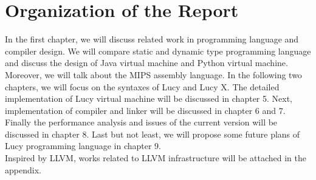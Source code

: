 \section{Organization of the Report}
In the first chapter, we will discuss related work in programming language and compiler design. We will compare static and dynamic type programming language and discuss the design of Java virtual machine and Python virtual machine. Moreover, we will talk about the MIPS assembly language. In the following two chapters, we will focus on the syntaxes of Lucy and Lucy X. The detailed implementation of Lucy virtual machine will be discussed in chapter 5. Next, implementation of compiler and linker will be discussed in chapter 6 and 7. Finally the performance analysis and issues of the current version will be discussed in chapter 8. Last but not least, we will propose some future plans of Lucy programming language in chapter 9. \\
Inspired by LLVM, works related to LLVM infrastructure will be attached in the appendix.
